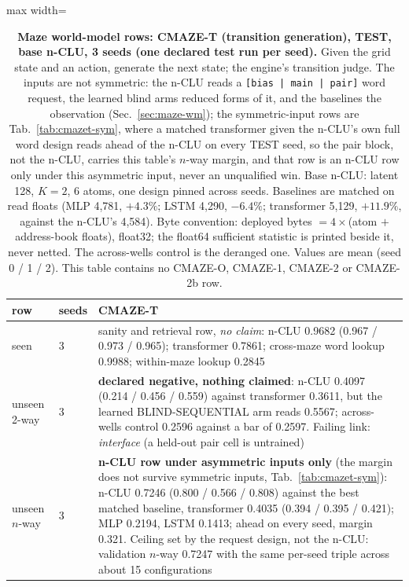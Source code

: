 \documentclass{article} %
\begin{document}
\begin{table}[h]
\centering\scriptsize
\caption{\textbf{Maze world-model rows: CMAZE-T (transition generation), TEST, base n-CLU, 3 seeds %
(one declared test run per seed).} Given the grid state and an action, generate the next
state; the engine's transition judge. The inputs are not symmetric: the n-CLU reads a \texttt{[bias | main |
pair]} word request, the learned blind arms reduced forms of it, and the baselines the observation
(Sec.~\ref{sec:maze-wm}); the symmetric-input rows are Tab.~\ref{tab:cmazet-sym}, where a matched
transformer given the n-CLU's own full word design reads ahead of the n-CLU on every TEST seed, so the %
pair block, not the n-CLU, carries this table's $n$-way margin, and that row is an n-CLU row only
under this asymmetric input, never an unqualified win. Base n-CLU: latent 128, $K=2$, 6 atoms, one design pinned across seeds. %
Baselines are matched on read floats (MLP 4,781, $+4.3\%$; LSTM 4,290, $-6.4\%$; transformer 5,129, %
$+11.9\%$, against the n-CLU's 4,584). %
Byte convention: deployed bytes $=4\times$(atom $+$
address-book floats), float32; the float64 sufficient statistic is printed beside it, never netted.
The across-wells control is the deranged one. Values are mean (seed 0 / 1 / 2). This table contains
no CMAZE-O, CMAZE-1, CMAZE-2 or CMAZE-2b row.}
\label{tab:cmazet}\label{tab:cmaze-del}
\setlength{\tabcolsep}{2pt}
\begin{adjustbox}{max width=\linewidth}\begin{tabular}{p{1.9cm}p{1.2cm}p{10.0cm}}
\toprule
row & seeds & CMAZE-T \\
\midrule
seen & 3 & sanity and retrieval row, \emph{no claim}: n-CLU 0.9682 (0.967 / 0.973 / 0.965); transformer 0.7861; cross-maze word lookup 0.9988; within-maze lookup 0.2845 \\
unseen 2-way & 3 & \textbf{declared negative, nothing claimed}: n-CLU 0.4097 (0.214 / 0.456 / 0.559) against transformer 0.3611, but the learned BLIND-SEQUENTIAL arm reads 0.5567; across-wells control 0.2596 against a bar of 0.2597. Failing link: \emph{interface} (a held-out pair cell is untrained) \\
unseen $n$-way & 3 & \textbf{n-CLU row under asymmetric inputs only} (the margin does not survive symmetric inputs, Tab.~\ref{tab:cmazet-sym}): n-CLU 0.7246 (0.800 / 0.566 / 0.808) against the best matched baseline, transformer 0.4035 (0.394 / 0.395 / 0.421); MLP 0.2194, LSTM 0.1413; ahead on every seed, margin 0.321. Ceiling set by the request design, not the n-CLU: validation $n$-way 0.7247 with the same per-seed triple across about 15 configurations \\

\end{tabular}
\end{adjustbox}
\end{table}
\end{document}
